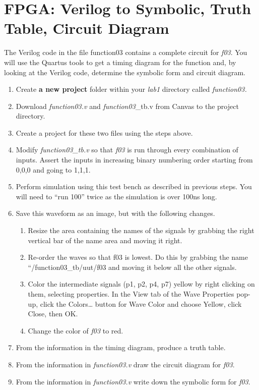 \section{FPGA: Verilog to Symbolic, Truth Table, Circuit Diagram}

The Verilog code in the file function03 contains a complete circuit for
\emph{f03}. You will use the Quartus tools to get a timing diagram for
the function and, by looking at the Verilog code, determine the symbolic
form and circuit diagram.

\begin{enumerate}
\def\labelenumi{\arabic{enumi}.}
\item
  Create \textbf{a new project} folder within your \emph{lab1} directory
  called \emph{function03.}
\item
  Download \emph{function03.v} and \emph{function03}\_tb.v from Canvas
  to the project directory.
\item
  Create a project for these two files using the steps above.
\item
  Modify \emph{function03\_tb.v} so that \emph{f03} is run through every
  combination of inputs. Assert the inputs in increasing binary
  numbering order starting from 0,0,0 and going to 1,1,1.
\item
  Perform simulation using this test bench as described in previous
  steps. You will need to ``run 100'' twice as the simulation is over
  100ns long.
\item
  \protect\hypertarget{Part_3_Step_6}{}{}Save this waveform as an image,
  but with the following changes.

  \begin{enumerate}
  \def\labelenumii{\alph{enumii}.}
  \item
    Resize the area containing the names of the signals by grabbing the
    right vertical bar of the name area and moving it right.
  \item
    Re-order the waves so that f03 is lowest. Do this by grabbing the
    name ``/function03\_tb/uut/f03 and moving it below all the other
    signals.
  \item
    Color the intermediate signals (p1, p2, p4, p7) yellow by right
    clicking on them, selecting properties. In the View tab of the Wave
    Properties pop-up, click the Colors\ldots{} button for Wave Color
    and choose Yellow, click Close, then OK.
  \item
    Change the color of \emph{f03} to red.
  \end{enumerate}
\item
  \protect\hypertarget{Part_3_Step_7}{}{}From the information in the
  timing diagram, produce a truth table.
\item
  \protect\hypertarget{Part_3_Step_8}{}{}From the information in
  \emph{function03.v} draw the circuit diagram for \emph{f03}.
\item
  \protect\hypertarget{Part_3_Step_9}{}{}From the information in
  \emph{function03.v} write down the symbolic form for \emph{f03}.
\end{enumerate}



